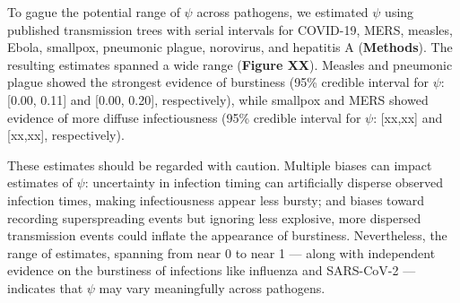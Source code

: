 To gague the potential range of $\psi$ across pathogens, we estimated $\psi$ using published transmission trees with serial intervals for COVID-19, MERS, measles, Ebola, smallpox, pneumonic plague, norovirus, and hepatitis A \citep{taube_open-access_2022} ({\bf Methods}). The resulting estimates spanned a wide range ({\bf Figure XX}). Measles and pneumonic plague showed the strongest evidence of burstiness (95\% credible interval for $\psi$: [0.00, 0.11] and [0.00, 0.20], respectively), while smallpox and MERS showed evidence of more diffuse infectiousness (95\% credible interval for $\psi$: [xx,xx] and [xx,xx], respectively). 

These estimates should be regarded with caution. Multiple biases can impact estimates of $\psi$: uncertainty in infection timing can artificially disperse observed infection times, making infectiousness appear less bursty; and biases toward recording superspreading events but ignoring less explosive, more dispersed transmission events could inflate the appearance of burstiness. Nevertheless, the range of estimates, spanning from near 0 to near 1 --- along with independent evidence on the burstiness of infections like influenza and SARS-CoV-2 \citep{goyal_viral_2021} --- indicates that $\psi$ may vary meaningfully across pathogens. 








